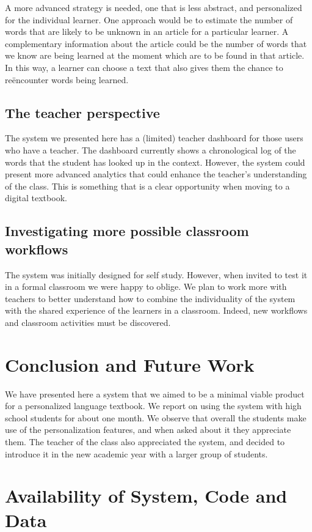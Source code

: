 A more advanced strategy is needed, one that is less abstract, and personalized for the individual learner. One approach would be to estimate the number of words that are likely to be unknown in an article for a particular learner. A complementary information about the article could be the number of words that we know are being learned at the moment which are to be found in that article. In this way, a learner can choose a text that also gives them the chance to re{\"e}ncounter words being learned. 

\subsection{The teacher perspective}
The system we presented here has a (limited) teacher dashboard for those users who have a teacher. The dashboard currently shows a chronological log of the words that the student has looked up in the context. However, the system could present more advanced analytics that could enhance the teacher's understanding of the class. This is something that is a clear opportunity when moving to a digital textbook. 

\subsection{Investigating more possible classroom workflows}
The system was initially designed for self study. However, when invited to test it in a formal classroom we were happy to oblige. We plan to work more with teachers to better understand how to combine the individuality of the system with the shared experience of the learners in a classroom. Indeed, new workflows and classroom activities must be discovered.


\section{Conclusion and Future Work}
We have presented here a system that we aimed to be a minimal viable product for a personalized language textbook. We report on using the system with high school students for about one month. We observe that overall the students make use of the personalization features, and when asked about it they appreciate them. The teacher of the class also appreciated the system, and decided to introduce it in the new academic year with a larger group of students. 


\section{Availability of System, Code and Data}

